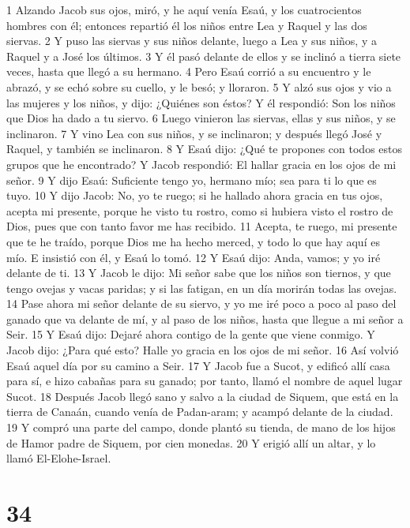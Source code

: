 1 Alzando Jacob sus ojos, miró, y he aquí venía Esaú, y los cuatrocientos hombres con él; entonces repartió él los niños entre Lea y Raquel y las dos siervas.
2 Y puso las siervas y sus niños delante, luego a Lea y sus niños, y a Raquel y a José los últimos.
3 Y él pasó delante de ellos y se inclinó a tierra siete veces, hasta que llegó a su hermano.
4 Pero Esaú corrió a su encuentro y le abrazó, y se echó sobre su cuello, y le besó; y lloraron.
5 Y alzó sus ojos y vio a las mujeres y los niños, y dijo: ¿Quiénes son éstos? Y él respondió: Son los niños que Dios ha dado a tu siervo.
6 Luego vinieron las siervas, ellas y sus niños, y se inclinaron.
7 Y vino Lea con sus niños, y se inclinaron; y después llegó José y Raquel, y también se inclinaron.
8 Y Esaú dijo: ¿Qué te propones con todos estos grupos que he encontrado? Y Jacob respondió: El hallar gracia en los ojos de mi señor.
9 Y dijo Esaú: Suficiente tengo yo, hermano mío; sea para ti lo que es tuyo.
10 Y dijo Jacob: No, yo te ruego; si he hallado ahora gracia en tus ojos, acepta mi presente, porque he visto tu rostro, como si hubiera visto el rostro de Dios, pues que con tanto favor me has recibido.
11 Acepta, te ruego, mi presente que te he traído, porque Dios me ha hecho merced, y todo lo que hay aquí es mío. E insistió con él, y Esaú lo tomó.
12 Y Esaú dijo: Anda, vamos; y yo iré delante de ti.
13 Y Jacob le dijo: Mi señor sabe que los niños son tiernos, y que tengo ovejas y vacas paridas; y si las fatigan, en un día morirán todas las ovejas.
14 Pase ahora mi señor delante de su siervo, y yo me iré poco a poco al paso del ganado que va delante de mí, y al paso de los niños, hasta que llegue a mi señor a Seir.
15 Y Esaú dijo: Dejaré ahora contigo de la gente que viene conmigo. Y Jacob dijo: ¿Para qué esto? Halle yo gracia en los ojos de mi señor.
16 Así volvió Esaú aquel día por su camino a Seir.
17 Y Jacob fue a Sucot, y edificó allí casa para sí, e hizo cabañas para su ganado; por tanto, llamó el nombre de aquel lugar Sucot.
18 Después Jacob llegó sano y salvo a la ciudad de Siquem, que está en la tierra de Canaán, cuando venía de Padan-aram; y acampó delante de la ciudad.
19 Y compró una parte del campo, donde plantó su tienda, de mano de los hijos de Hamor padre de Siquem, por cien monedas.
20 Y erigió allí un altar, y lo llamó El-Elohe-Israel.

\chapter{34}

